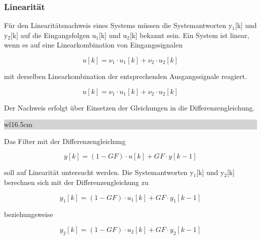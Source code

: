 \subsubsection{Linearität}

\noindent F\"{u}r den Linearit\"{a}tsnachweis eines Systems m\"{u}ssen die Systemantworten y${}_{1}$[k] und y${}_{2}$[k] auf die Eingangsfolgen u${}_{1}$[k] und u${}_{2}$[k] bekannt sein. Ein System ist linear, wenn es auf eine Linearkombination von Eingangssignalen 

\begin{equation}\label{eq:fourtwenty}
u\left[k\right]=\nu _{1} \cdot u_{1} \left[k\right]+\nu _{2} \cdot u_{2} \left[k\right]
\end{equation}

\noindent mit derselben Linearkombination der entsprechenden Ausgangssignale reagiert. 

\begin{equation}\label{eq:fourtwentyone}
u\left[k\right]=\nu _{1} \cdot u_{1} \left[k\right]+\nu _{2} \cdot u_{2} \left[k\right]
\end{equation}

\noindent Der Nachweis erfolgt \"{u}ber Einsetzen der Gleichungen in die Differenzengleichung.\bigskip

\noindent
\colorbox{lightgray}{%
%
\renewcommand\arraystretch{0.6}%
\begin{tabular}{ wl{16.5cm} }
{}
\end{tabular}%
}\medskip

\noindent Das Filter mit der Differenzengleichung 

\begin{equation}\label{eq:fourtwentytwo}
y\left[k\right]=\left(1-GF\right)\cdot u\left[k\right]+GF\cdot y\left[k-1\right]
\end{equation}

\noindent soll auf Linearit\"{a}t untersucht werden. Die Systemantworten y${}_{1}$[k] und y${}_{2}$[k] berechnen sich mit der Differenzengleichung zu

\begin{equation}\label{eq:fourtwentythree}
y_{1} \left[k\right]=\left(1-GF\right)\cdot u_{1} \left[k\right]+GF\cdot y_{1} \left[k-1\right]
\end{equation}

\noindent beziehungsweise

\begin{equation}\label{eq:fourtwentyfour}
y_{2} \left[k\right]=\left(1-GF\right)\cdot u_{2} \left[k\right]+GF\cdot y_{2} \left[k-1\right]
\end{equation}

